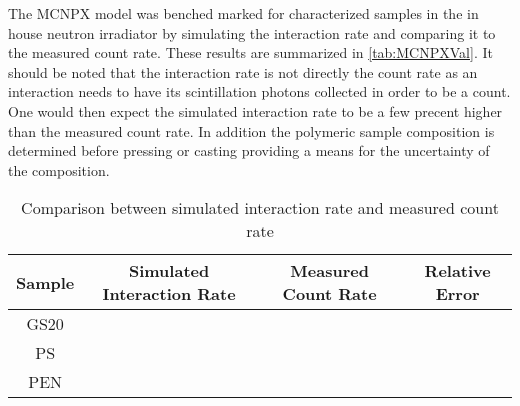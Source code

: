 The MCNPX model was benched marked for characterized samples in the in house  neutron irradiator by simulating the interaction rate and comparing it to the measured count rate.
These results are summarized in \autoref{tab:MCNPXVal}.
It should be noted that the interaction rate is not directly the count rate as an interaction needs to have its scintillation photons collected in order to be a count. 
One would then expect the simulated interaction rate to be a few precent higher than the measured count rate.
In addition the polymeric sample composition is determined before pressing or casting providing a means for the uncertainty of the composition.
\begin{table}
	\caption[MCNPX Validation Results]{Comparison between simulated interaction rate and measured count rate}
	\label{tab:MCNPXVal}
	\begin{tabular}{c | c c | c}
		\toprule
			Sample & Simulated Interaction Rate & Measured Count Rate & Relative Error \\
		\midrule
			GS20 &  & &  \\ 
			PS & & & \\
			PEN & & & \\
		\bottomrule
	\end{tabular}
\end{table}
